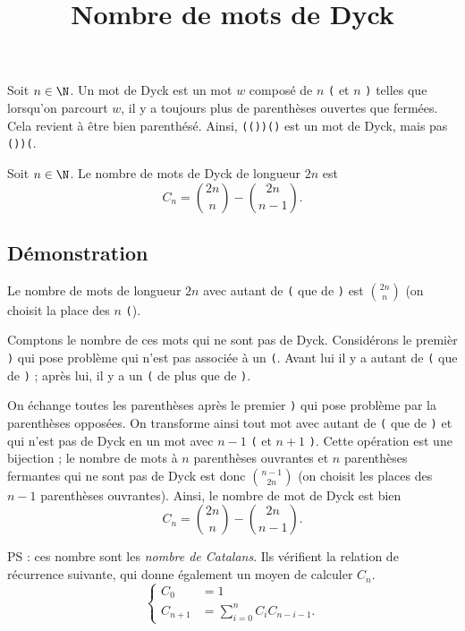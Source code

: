 \documentclass[fontsize=12pt,twoside=false,parskip=half, french]{scrartcl}
\title{Nombre de mots de Dyck}
\date{}
\author{}
\begin{document}
\maketitle
   Soit $n \in \N$. Un mot de Dyck est un mot $w$ composé de $n$ \texttt{(} 
   et $n$ \texttt{)} telles que lorsqu'on parcourt $w$, il y a toujours plus de 
   parenthèses ouvertes que fermées. Cela revient à être bien parenthésé. Ainsi,
   \texttt{(())()} est un mot de Dyck, mais pas \texttt{())(}.
   
   \begin{Theoreme}
      Soit $n \in \N$. Le nombre de mots de Dyck de longueur $2n$ est
      \[
         C_n = \binom{2n}{n} - \binom{2n}{n - 1}.
      \]
   \end{Theoreme}
   \subsection{Démonstration}
      Le nombre de mots de longueur $2n$ avec autant de \texttt{(} que de 
      \texttt{)} est $\binom{2n}{n}$ (on choisit la place des $n$ \texttt{(}).
      
      Comptons le nombre de ces mots qui ne sont pas de Dyck. Considérons le 
      premièr \texttt{)} qui pose problème \ie{} qui n'est pas associée
      à un \texttt{(}. Avant lui il y a autant de \texttt{(} que de \texttt{)} ; 
      après lui, il y a un \texttt{(} de plus que de \texttt{)}.
      
      On échange toutes les parenthèses après le premier \texttt{)} qui pose
      problème par la parenthèses opposées. On transforme ainsi tout mot avec
      autant de \texttt{(}  que de \texttt{)} et qui n'est pas de Dyck en un mot
      avec $n - 1$ \texttt{(} et $n + 1$ \texttt{)}. Cette opération est une 
      bijection ; le nombre de mots à $n$ parenthèses ouvrantes et $n$ 
      parenthèses fermantes qui ne sont pas de Dyck est donc $\binom{n - 1}{2n}$
      (on choisit les places des  $n - 1$ parenthèses ouvrantes).
      Ainsi, le nombre de mot de Dyck est bien
      \[
         C_n = \binom{2n}{n} - \binom{2n}{n - 1}.
      \] 
      
      PS : ces nombre sont les \emph{nombre de Catalans}. Ils vérifient
      la relation de récurrence suivante, qui donne également un moyen de calculer
      $C_n$.
      \[
      \begin{cases}
         C_0 &= 1\\
         C_{n + 1} &= \sum_{i = 0}^n C_iC_{n - i - 1}.
      \end{cases}
      \]
\end{document}
